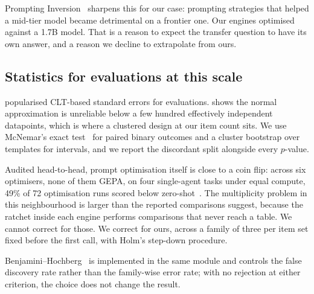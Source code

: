 Prompting Inversion~\citep{promptinginversion2025} sharpens this for our
case: prompting strategies that helped a mid-tier model became detrimental
on a frontier one. Our engines optimised against a 1.7B model. That is a
reason to expect the transfer question to have its own answer, and a reason
we decline to extrapolate from ours.

\subsection{Statistics for evaluations at this scale}

\citet{miller2024errorbars} popularised CLT-based standard errors for
evaluations. \citet{noclt2025} shows the normal approximation is unreliable
below a few hundred effectively independent datapoints, which is where a
clustered design at our item count sits. We use McNemar's exact
test~\citep{mcnemar1947note} for paired binary outcomes and a cluster
bootstrap over templates for intervals, and we report the discordant split
alongside every $p$-value.

Audited head-to-head, prompt optimisation itself is close to a coin flip:
across six optimisers, none of them GEPA, on four single-agent tasks under
equal compute, 49\% of 72 optimisation runs scored below
zero-shot~\citep{promptcoinflip2026}. The multiplicity problem in this
neighbourhood is larger than the reported comparisons suggest, because the
ratchet inside each engine performs comparisons that never reach a table. We
cannot correct for those. We correct for ours, across a family of three per
item set fixed before the first call, with Holm's step-down procedure.

Benjamini--Hochberg~\citep{benjamini1995fdr} is implemented in the same
module and controls the false discovery rate rather than the family-wise
error rate; with no rejection at either criterion, the choice does not
change the result.
